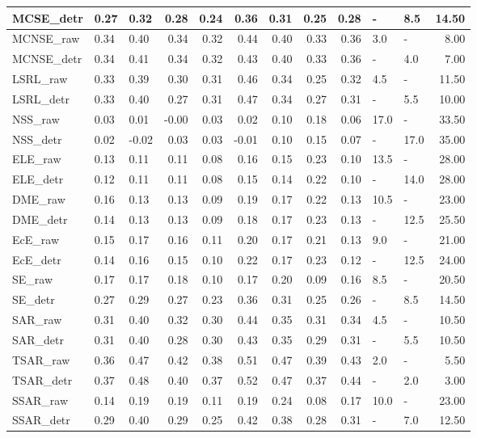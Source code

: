 \begin{tabular}{lllrrrrrrllr}
MCSE\_detr & 0.27 & 0.32 & 0.28 & 0.24 & 0.36 & 0.31 & 0.25 & 0.28 & - & 8.5 & 14.50 \\
\midrule
MCNSE\_raw & 0.34 & 0.40 & 0.34 & 0.32 & 0.44 & 0.40 & 0.33 & 0.36 & 3.0 & - & 8.00 \\
MCNSE\_detr & 0.34 & 0.41 & 0.34 & 0.32 & 0.43 & 0.40 & 0.33 & 0.36 & - & 4.0 & 7.00 \\
\midrule
LSRL\_raw & 0.33 & 0.39 & 0.30 & 0.31 & 0.46 & 0.34 & 0.25 & 0.32 & 4.5 & - & 11.50 \\
LSRL\_detr & 0.33 & 0.40 & 0.27 & 0.31 & 0.47 & 0.34 & 0.27 & 0.31 & - & 5.5 & 10.00 \\
\midrule
NSS\_raw & 0.03 & 0.01 & -0.00 & 0.03 & 0.02 & 0.10 & 0.18 & 0.06 & 17.0 & - & 33.50 \\
NSS\_detr & 0.02 & -0.02 & 0.03 & 0.03 & -0.01 & 0.10 & 0.15 & 0.07 & - & 17.0 & 35.00 \\
\midrule
ELE\_raw & 0.13 & 0.11 & 0.11 & 0.08 & 0.16 & 0.15 & 0.23 & 0.10 & 13.5 & - & 28.00 \\
ELE\_detr & 0.12 & 0.11 & 0.11 & 0.08 & 0.15 & 0.14 & 0.22 & 0.10 & - & 14.0 & 28.00 \\
\midrule
DME\_raw & 0.16 & 0.13 & 0.13 & 0.09 & 0.19 & 0.17 & 0.22 & 0.13 & 10.5 & - & 23.00 \\
DME\_detr & 0.14 & 0.13 & 0.13 & 0.09 & 0.18 & 0.17 & 0.23 & 0.13 & - & 12.5 & 25.50 \\
\midrule
EcE\_raw & 0.15 & 0.17 & 0.16 & 0.11 & 0.20 & 0.17 & 0.21 & 0.13 & 9.0 & - & 21.00 \\
EcE\_detr & 0.14 & 0.16 & 0.15 & 0.10 & 0.22 & 0.17 & 0.23 & 0.12 & - & 12.5 & 24.00 \\
\midrule
SE\_raw & 0.17 & 0.17 & 0.18 & 0.10 & 0.17 & 0.20 & 0.09 & 0.16 & 8.5 & - & 20.50 \\
SE\_detr & 0.27 & 0.29 & 0.27 & 0.23 & 0.36 & 0.31 & 0.25 & 0.26 & - & 8.5 & 14.50 \\
\midrule
SAR\_raw & 0.31 & 0.40 & 0.32 & 0.30 & 0.44 & 0.35 & 0.31 & 0.34 & 4.5 & - & 10.50 \\
SAR\_detr & 0.31 & 0.40 & 0.28 & 0.30 & 0.43 & 0.35 & 0.29 & 0.31 & - & 5.5 & 10.50 \\
\midrule
TSAR\_raw & 0.36 & 0.47 & 0.42 & 0.38 & 0.51 & 0.47 & 0.39 & 0.43 & 2.0 & - & 5.50 \\
TSAR\_detr & 0.37 & 0.48 & 0.40 & 0.37 & 0.52 & 0.47 & 0.37 & 0.44 & - & 2.0 & 3.00 \\
\midrule
SSAR\_raw & 0.14 & 0.19 & 0.19 & 0.11 & 0.19 & 0.24 & 0.08 & 0.17 & 10.0 & - & 23.00 \\
SSAR\_detr & 0.29 & 0.40 & 0.29 & 0.25 & 0.42 & 0.38 & 0.28 & 0.31 & - & 7.0 & 12.50 \\
\midrule
\bottomrule
\end{tabular}
\midrule
